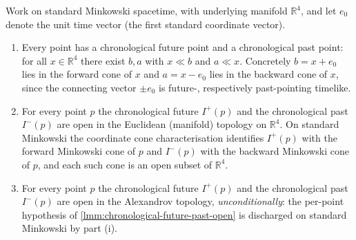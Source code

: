 \begin{lemma}
    \label{lmm:minkowski-chronological-open}
    \leanok
    Work on standard Minkowski spacetime, with underlying manifold $\mathbb{R}^4$, and let $e_0$ denote the unit time vector (the first standard coordinate vector).
    \begin{enumerate}
        \item Every point has a chronological future point and a chronological past point: for all $x \in \mathbb{R}^4$ there exist $b, a$ with $x \ll b$ and $a \ll x$. Concretely $b = x + e_0$ lies in the forward cone of $x$ and $a = x - e_0$ lies in the backward cone of $x$, since the connecting vector $\pm e_0$ is future-, respectively past-pointing timelike.
        \item For every point $p$ the chronological future $I^+(p)$ and the chronological past $I^-(p)$ are open in the Euclidean (manifold) topology on $\mathbb{R}^4$. On standard Minkowski the coordinate cone characterisation identifies $I^+(p)$ with the forward Minkowski cone of $p$ and $I^-(p)$ with the backward Minkowski cone of $p$, and each such cone is an open subset of $\mathbb{R}^4$.
        \item For every point $p$ the chronological future $I^+(p)$ and the chronological past $I^-(p)$ are open in the Alexandrov topology, \emph{unconditionally}: the per-point hypothesis of \ref{lmm:chronological-future-past-open} is discharged on standard Minkowski by part (i).
    \end{enumerate}
\end{lemma}
